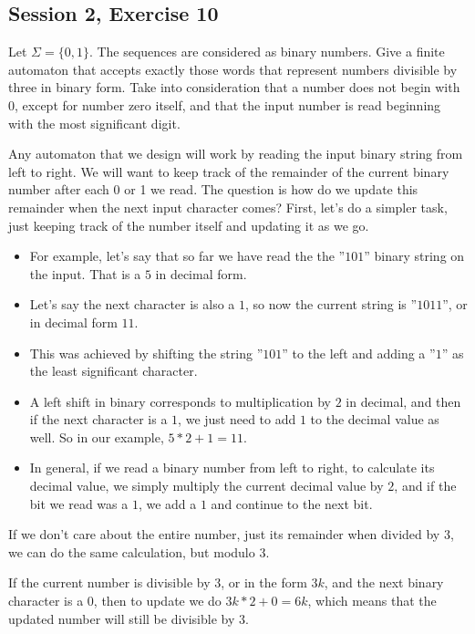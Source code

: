 \subsection{Session 2, Exercise 10}


Let $\Sigma = \{0, 1\}$. The sequences are considered as binary numbers. Give a finite automaton that accepts exactly those words that represent numbers divisible by three in binary form. Take into consideration that a number does not begin with $0$, except for number zero itself, and that the input number is read beginning with the most significant digit.


Any automaton that we design will work by reading the input binary string from left to right. We will want to keep track of the remainder of the current binary number after each 0 or 1 we read. The question is how do we update this remainder when the next input character comes? First, let's do a simpler task, just keeping track of the number itself and updating it as we go.

\begin{itemize}
    \item For example, let's say that so far we have read the the ''$101$'' binary string on the input. That is a $5$ in decimal form.
    \item Let's say the next character is also a $1$, so now the current string is ''$1011$'', or in decimal form $11$.
    \item This was achieved by shifting the string ''$101$'' to the left and adding a ''$1$'' as the least significant character.
    \item A left shift in binary corresponds to multiplication by $2$ in decimal, and then if the next character is a $1$, we just need to add $1$ to the decimal value as well. So in our example, $5*2 + 1 = 11$.
    \item In general, if we read a binary number from left to right, to calculate its decimal value, we simply multiply the current decimal value by $2$, and if the bit we read was a $1$, we add a $1$ and continue to the next bit.
\end{itemize}
 
If we don't care about the entire number, just its remainder when divided by $3$, we can do the same calculation, but modulo $3$.

If the current number is divisible by $3$, or in the form $3k$, and the next binary character is a $0$, then to update we do $3k*2+0 = 6k$, which means that the updated number will still be divisible by $3$.

